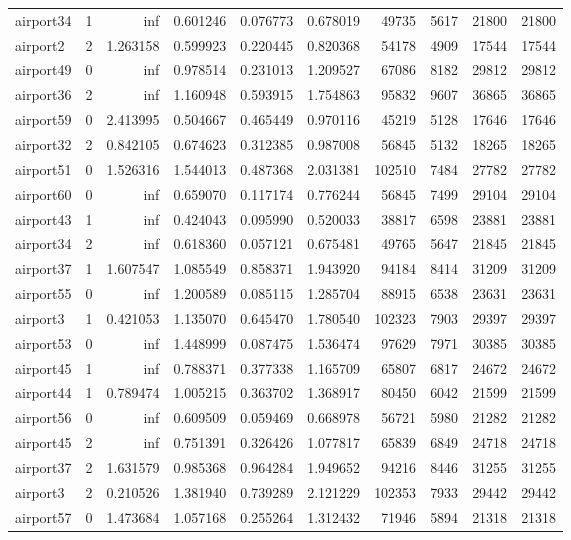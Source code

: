 \begin{longtable}{|l|r|r|r|r|r|r|r|r|r|}
airport34 & 1 & inf & 0.601246 & 0.076773 & 0.678019 & 49735 & 5617 & 21800 & 21800 \\
airport2 & 2 & 1.263158 & 0.599923 & 0.220445 & 0.820368 & 54178 & 4909 & 17544 & 17544 \\
airport49 & 0 & inf & 0.978514 & 0.231013 & 1.209527 & 67086 & 8182 & 29812 & 29812 \\
airport36 & 2 & inf & 1.160948 & 0.593915 & 1.754863 & 95832 & 9607 & 36865 & 36865 \\
airport59 & 0 & 2.413995 & 0.504667 & 0.465449 & 0.970116 & 45219 & 5128 & 17646 & 17646 \\
airport32 & 2 & 0.842105 & 0.674623 & 0.312385 & 0.987008 & 56845 & 5132 & 18265 & 18265 \\
airport51 & 0 & 1.526316 & 1.544013 & 0.487368 & 2.031381 & 102510 & 7484 & 27782 & 27782 \\
airport60 & 0 & inf & 0.659070 & 0.117174 & 0.776244 & 56845 & 7499 & 29104 & 29104 \\
airport43 & 1 & inf & 0.424043 & 0.095990 & 0.520033 & 38817 & 6598 & 23881 & 23881 \\
airport34 & 2 & inf & 0.618360 & 0.057121 & 0.675481 & 49765 & 5647 & 21845 & 21845 \\
airport37 & 1 & 1.607547 & 1.085549 & 0.858371 & 1.943920 & 94184 & 8414 & 31209 & 31209 \\
airport55 & 0 & inf & 1.200589 & 0.085115 & 1.285704 & 88915 & 6538 & 23631 & 23631 \\
airport3 & 1 & 0.421053 & 1.135070 & 0.645470 & 1.780540 & 102323 & 7903 & 29397 & 29397 \\
airport53 & 0 & inf & 1.448999 & 0.087475 & 1.536474 & 97629 & 7971 & 30385 & 30385 \\
airport45 & 1 & inf & 0.788371 & 0.377338 & 1.165709 & 65807 & 6817 & 24672 & 24672 \\
airport44 & 1 & 0.789474 & 1.005215 & 0.363702 & 1.368917 & 80450 & 6042 & 21599 & 21599 \\
airport56 & 0 & inf & 0.609509 & 0.059469 & 0.668978 & 56721 & 5980 & 21282 & 21282 \\
airport45 & 2 & inf & 0.751391 & 0.326426 & 1.077817 & 65839 & 6849 & 24718 & 24718 \\
airport37 & 2 & 1.631579 & 0.985368 & 0.964284 & 1.949652 & 94216 & 8446 & 31255 & 31255 \\
airport3 & 2 & 0.210526 & 1.381940 & 0.739289 & 2.121229 & 102353 & 7933 & 29442 & 29442 \\
airport57 & 0 & 1.473684 & 1.057168 & 0.255264 & 1.312432 & 71946 & 5894 & 21318 & 21318 \\

\end{longtable}
